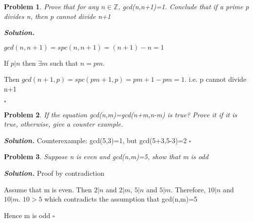 \documentclass[12pt]{article}
\newtheorem{problem}{Problem}
\newenvironment{solution}[1][\it{Solution}]{\textbf{#1. } }{$\square$}
\begin{document}
\begin{problem}
  Prove that for any $n\in\mathbb{Z}$, gcd(n,n+1)=1. Conclude that if a prime p divides n, then p cannot divide n+1
\end{problem}

\begin{solution}

$gcd(n,n+1)=spc(n,n+1)=(n+1)-n=1$

If $p|n$ then $\exists m$ such that $n=pm$.

Then $gcd(n+1,p)=spc(pm+1,p)=pm+1-pm=1$. i.e. p cannot divide n+1

\end{solution}

\begin{problem}
  If the equation gcd(n,m)=gcd(n+m,n-m) is true? Prove it if it is true, otherwise, give a counter example.
\end{problem}

\begin{solution}
Counterexample: gcd(5,3)=1, but gcd(5+3,5-3)=2
\end{solution}

\begin{problem}
  Suppose n is even and gcd(n,m)=5, show that m is odd
\end{problem}

\begin{solution}
Proof by contradiction

Assume that m is even. Then $2|n$ and $2|m$, $5|n$ and $5|m$. Therefore, $10|n$ and $10|m$. $10>5$ which contradicts the assumption that gcd(n,m)=5

Hence m is odd
\end{solution}
\end{document}
